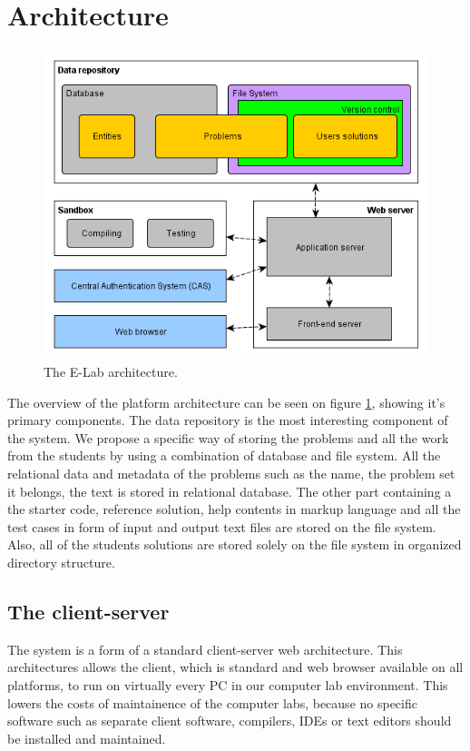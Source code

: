 \documentclass{article}
\begin{document}
\section{Architecture}

\begin{figure}
\centering
\includegraphics[width=.99\textwidth]{e-lab/architecture}
\caption{The E-Lab architecture.}
\label{fig:architecture}
\end{figure}

The overview of the platform architecture can be seen on figure
\ref{fig:architecture}, showing it's primary components. The data repository
is the most interesting component of the system. We propose a specific way of
storing the problems and all the work from the students by using a combination
of database and file system. All the relational data and metadata of the
problems such as the name, the problem set it belongs, the text is stored in
relational database. The other part containing a the starter code, reference
solution, help contents in markup language and all the test cases in form of
input and output text files are stored on the file system. Also, all of the
students solutions are stored solely on the file system in organized directory
structure.

\subsection{The client-server}

The system is a form of a standard client-server web architecture. This
architectures allows the client, which is standard and web browser available on
all platforms, to run on virtually every PC in our computer lab environment.
This lowers the costs of maintainence of the computer labs, because no specific
software such as separate client software, compilers, IDEs or text editors
should be installed and maintained.
\end{document}
